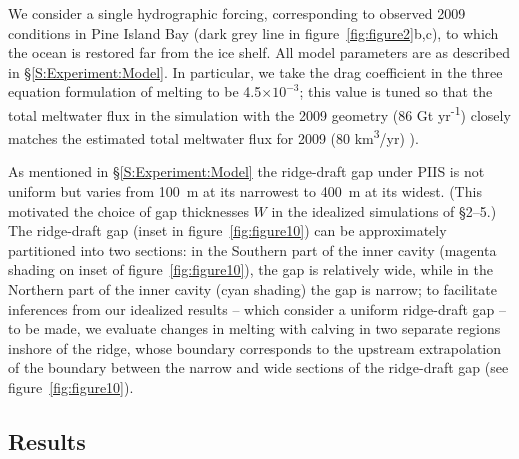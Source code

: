 \documentclass[draft]{agujournal2019}
\begin{document}
We consider a single hydrographic forcing, corresponding to observed 2009 conditions in Pine Island Bay (dark grey line in figure~\ref{fig:figure2}b,c), to which the ocean is restored far from the ice shelf. All model parameters are as described in \S\ref{S:Experiment:Model}. In particular, we take the drag coefficient in the three equation formulation of melting to be 4.5$\times10^{-3}$; this value is tuned so that the total meltwater flux in the simulation with the 2009 geometry (86 Gt yr\textsuperscript{-1}) closely matches the estimated total meltwater flux for 2009 (80 km\textsuperscript{3}/yr) \cite{Dutrieux2014Science}). %

As mentioned in \S\ref{S:Experiment:Model} the ridge-draft gap under PIIS is not uniform but varies from 100~m at its narrowest to 400~m at its widest. (This motivated the choice of gap thicknesses $W$ in the idealized simulations of \S2--5.) The ridge-draft gap (inset in figure~\ref{fig:figure10}) can be approximately partitioned into two sections: in the Southern part of the inner cavity (magenta shading on inset of figure~\ref{fig:figure10}), the gap is relatively wide, while in the Northern part of the inner cavity (cyan shading) the gap is narrow; to facilitate inferences from our idealized results -- which consider a uniform ridge-draft gap -- to be made, we evaluate changes in melting with calving in two separate regions inshore of the ridge, whose boundary corresponds to the upstream extrapolation of the boundary between the narrow and wide sections of the ridge-draft gap (see figure~\ref{fig:figure10}). 

\subsection{Results}
\end{document}
